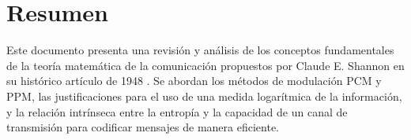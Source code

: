 \chapter*{Resumen}

Este documento presenta una revisión y análisis de los conceptos fundamentales de la teoría matemática de la comunicación propuestos por Claude E. Shannon en su histórico artículo de 1948 \parencite{shannon1948mathematical}. Se abordan los métodos de modulación PCM y PPM, las justificaciones para el uso de una medida logarítmica de la información, y la relación intrínseca entre la entropía y la capacidad de un canal de transmisión para codificar mensajes de manera eficiente.
